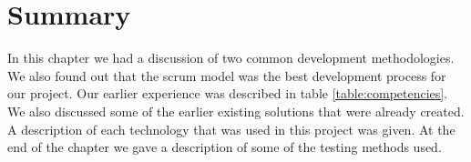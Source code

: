 \section{Summary}
\label{section:summary}

In this chapter we had a discussion of two common development methodologies.
We also found out that the scrum model was the best development process for our project.
Our earlier experience was described in table \ref{table:competencies}.
We also discussed some of the earlier existing solutions that were already created.
A description of each technology that was used in this project was given. 
At the end of the chapter we gave a description of some of the testing methods used.